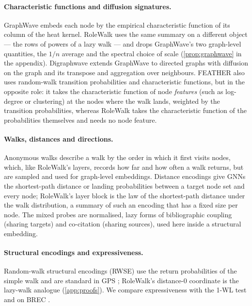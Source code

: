 \documentclass[10pt]{article}
\theoremstyle{definition}
\begin{document}
\paragraph{Characteristic functions and diffusion signatures.}
GraphWave \citep{donnat2018} embeds each node by the empirical characteristic function of its column of the heat kernel.
RoleWalk uses the same summary on a different object --- the rows of powers of a lazy walk --- and drops GraphWave's two graph-level quantities, the $1/n$ average and the spectral choice of scale (\cref{prop:graphwave} in the appendix).
Digraphwave \citep{ceylan2022} extends GraphWave to directed graphs with diffusion on the graph and its transpose and aggregation over neighbours.
FEATHER \citep{rozemberczki2020feather} also uses random-walk transition probabilities and characteristic functions, but in the opposite role: it takes the characteristic function of node \emph{features} (such as log-degree or clustering) at the nodes where the walk lands, weighted by the transition probabilities, whereas RoleWalk takes the characteristic function of the probabilities themselves and needs no node feature.

\paragraph{Walks, distances and directions.}
Anonymous walks \citep{ivanov2018anonymous} describe a walk by the order in which it first visits nodes, which, like RoleWalk's layers, records how far and how often a walk returns, but are sampled and used for graph-level embeddings.
Distance encodings \citep{li2020distance} give GNNs the shortest-path distance or landing probabilities between a target node set and every node; RoleWalk's layer block is the law of the shortest-path distance under the walk distribution, a summary of such an encoding that has a fixed size per node.
The mixed probes are normalised, lazy forms of bibliographic coupling \citep{kessler1963} (sharing targets) and co-citation \citep{small1973} (sharing sources), used here inside a structural embedding.

\paragraph{Structural encodings and expressiveness.}
Random-walk structural encodings (RWSE) \citep{dwivedi2022} use the return probabilities of the simple walk and are standard in GPS \citep{rampasek2022}; RoleWalk's distance-0 coordinate is the lazy-walk analogue (\cref{app:proofs}).
We compare expressiveness with the 1-WL test \citep{weisfeiler1968,xu2019,morris2019} and on BREC \citep{wang2023}.
\end{document}
